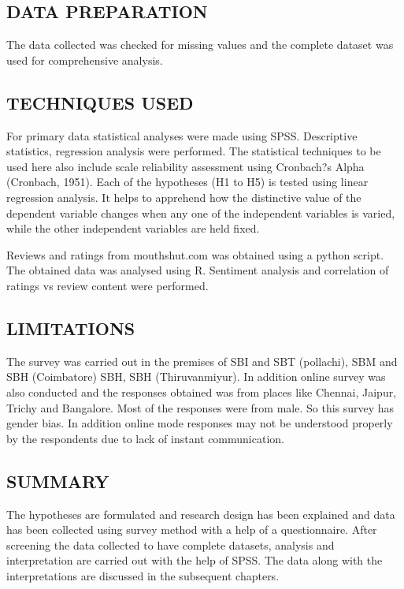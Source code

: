 \documentclass[a4paper, 12pt]{extarticle}
\begin{document}
{\subsection{DATA PREPARATION}
The data collected was checked for missing values and the complete dataset was used for comprehensive analysis.

\subsection{TECHNIQUES USED}
For primary data statistical analyses were made using SPSS. Descriptive statistics, regression analysis were performed. The statistical techniques to be used here also include scale reliability assessment using Cronbach?s Alpha (Cronbach, 1951). Each of the hypotheses (H1 to H5) is tested using linear regression analysis. It helps to apprehend how the distinctive value of the dependent variable changes when any one of the independent variables is varied, while the other independent variables are held fixed.

Reviews and ratings from mouthshut.com was obtained using a python script. The obtained data was analysed using R. Sentiment analysis and correlation of ratings vs review content were performed.
 

\subsection{LIMITATIONS}
The survey was carried out in the premises of SBI and SBT (pollachi), SBM and SBH (Coimbatore) SBH, SBH (Thiruvanmiyur). In addition online survey was also conducted and the responses obtained was from places like Chennai, Jaipur, Trichy and Bangalore. Most of the responses were from male. So this survey has gender bias. In addition online mode responses may not be understood properly by the respondents due to lack of instant communication. 

\subsection{SUMMARY}
The hypotheses are formulated and research design has been explained and data has been collected using survey method with a help of a questionnaire. After screening the data collected to have complete datasets, analysis and interpretation are carried out with the help of SPSS. The data along with the interpretations are discussed in the subsequent chapters.

\newpage
}
\end{document}
